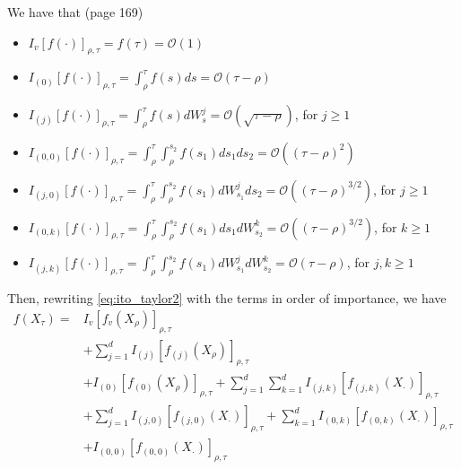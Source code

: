 \documentclass[12pt]{article}
\begin{document}
We have that (page 169)
\begin{itemize}
\item $I_v [f(\cdot)]_{\rho, \tau} = f(\tau) = \mathcal{O}(1)$
\item $I_{(0)} [f(\cdot)]_{\rho, \tau} = \int_{\rho}^{\tau} f(s) ds = \mathcal{O}(\tau - \rho)$
\item $I_{(j)} [f(\cdot)]_{\rho, \tau} = \int_{\rho}^{\tau} f(s) dW_s^j = \mathcal{O}(\sqrt{\tau - \rho})$, for $j \ge 1$
\item $I_{(0,0)} [f(\cdot)]_{\rho, \tau} = \int_{\rho}^{\tau} \int_{\rho}^{s_2} f(s_1) ds_1 ds_2 = \mathcal{O}((\tau - \rho)^2)$
\item $I_{(j,0)} [f(\cdot)]_{\rho, \tau} = \int_{\rho}^{\tau} \int_{\rho}^{s_2} f(s_1) dW_{s_1}^j ds_2 = \mathcal{O}((\tau - \rho)^{3/2})$, for $j \ge 1$
\item $I_{(0,k)} [f(\cdot)]_{\rho, \tau} = \int_{\rho}^{\tau} \int_{\rho}^{s_2} f(s_1) ds_1 dW_{s_2}^k = \mathcal{O}((\tau - \rho)^{3/2})$, for $k \ge 1$
\item $I_{(j,k)} [f(\cdot)]_{\rho, \tau} = \int_{\rho}^{\tau} \int_{\rho}^{s_2} f(s_1) dW_{s_1}^j dW_{s_2}^k = \mathcal{O}(\tau - \rho)$, for $j, k \ge 1$
\end{itemize}

Then, rewriting \eqref{eq:ito_taylor2} with the terms in order of importance, we have
\begin{equation} \label{eq:ito_taylor_sorted}
\begin{aligned}
f( X_\tau) =& I_{v} [f_{v} ( X_\rho)]_{\rho, \tau}  \\
&+ \sum_{j=1}^d I_{(j)} [f_{(j)}( X_\rho)]_{\rho, \tau} \\ &
+ I_{(0)} [f_{(0)}( X_\rho)]_{\rho, \tau} + \sum_{j=1}^d \sum_{k=1}^d I_{(j,k)} [f_{(j,k)} ( X_\cdot)]_{\rho, \tau} \\
& + \sum_{j=1}^d I_{(j,0)} [f_{(j,0)} ( X_\cdot)]_{\rho, \tau} + \sum_{k=1}^d  I_{(0,k)} [f_{(0,k)} ( X_\cdot)]_{\rho, \tau} \\
& + I_{(0,0)} [f_{(0,0)} ( X_\cdot)]_{\rho, \tau} 
\end{aligned}
\end{equation}
\end{document}
